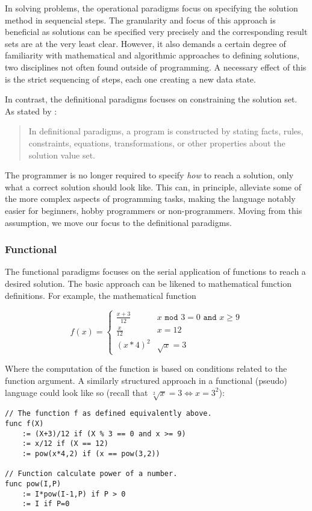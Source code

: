 In solving problems, the operational paradigms focus on specifying the solution method in sequencial steps. The granularity and focus of this approach is beneficial as solutions can be specified very precisely and the corresponding result sets are at the very least clear. However, it also demands a certain degree of familiarity with mathematical and algorithmic approaches to defining solutions, two disciplines not often found outside of programming. A necessary effect of this is the strict sequencing of steps, each one creating a new data state.

In contrast, the definitional paradigms focuses on constraining the solution set. As stated by \citep{paradigms1992}:

\begin{quote}
In definitional paradigms, a program is constructed by stating facts, rules, constraints, equations, transformations, or other properties about the solution value set.
\end{quote}

The programmer is no longer required to specify \emph{how} to reach a solution, only what a correct solution should look like. This can, in principle, alleviate some of the more complex aspects of programming tasks, making the language notably easier for beginners, hobby programmers or non-programmers. Moving from this assumption, we move our focus to the definitional paradigms.

\subsubsection*{Functional}
The functional paradigms focuses on the serial application of functions to reach a desired solution. The basic approach can be likened to mathematical function definitions. For example, the mathematical function

\[
f(x) =
\begin{cases} \frac{x+3}{12} & x \texttt{ mod } 3 = 0 \texttt{ and } x \geq 9
\\
\frac{x}{12} & x = 12
\\
(x * 4)^2 & \sqrt{x} = 3
\end{cases}
\]

Where the computation of the function is based on conditions related to the function argument. A similarly structured approach in a functional (pseudo) language could look like so (recall that $\sqrt[2]{x} = 3 \Leftrightarrow x = 3^2$):

\begin{lstlisting}
// The function f as defined equivalently above.
func f(X)
	:= (X+3)/12 if (X % 3 == 0 and x >= 9)
	:= x/12 if (X == 12)
	:= pow(x*4,2) if (x == pow(3,2))

// Function calculate power of a number.
func pow(I,P)
	:= I*pow(I-1,P) if P > 0
	:= I if P=0
\end{lstlisting}


